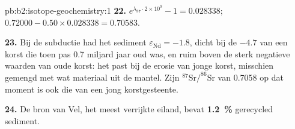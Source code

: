 \begin{solution}{pb:b2:isotope-geochemistry:1}
\textbf{22.} $e^{\lambda_{87}\cdot2\times10^9} - 1 = 0.028338$;
$0.72000 - 0.50\times0.028338 = 0.70583$.

\textbf{23.} Bij de subductie had het sediment $\varepsilon_{\mathrm{Nd}} = -1.8$, dicht bij de
$-4.7$ van een korst die toen pas 0.7 miljard jaar oud was, en ruim boven de
sterk negatieve waarden van oude korst: het past bij de erosie van jonge korst, misschien
gemengd met wat materiaal uit de mantel. Zijn $^{87}\mathrm{Sr}/^{86}\mathrm{Sr}$ van
0.7058 op dat moment is ook die van een jong korstgesteente.

\textbf{24.} De bron van Vel, het meest verrijkte eiland, bevat
\textbf{\qty[text-series-to-math=true]{1.2}{\percent}} gerecycled sediment.
\end{solution}
